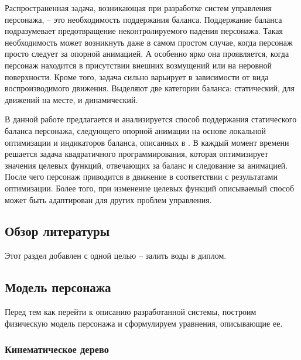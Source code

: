 Распространенная задача, возникающая при разработке систем управления персонажа, -- это необходимость поддержания баланса. Поддержание баланса подразумевает предотвращение неконтролируемого падения персонажа. Такая необходимость может возникнуть даже в самом простом случае, когда персонаж просто следует за опорной анимацией. А особенно ярко она проявляется, когда персонаж находится в присутствии внешних возмущений или на неровной поверхности. Кроме того, задача сильно варьирует в зависимости от вида воспроизводимого движения. Выделяют две категории баланса: статический, для движений на месте, и динамический.

В данной работе предлагается и анализируется способ поддержания статического баланса персонажа, следующего опорной анимации на основе локальной оптимизации и индикаторов баланса, описанных в \cite{MacchiettoZS}. В каждый момент времени решается задача квадратичного программирования, которая оптимизирует значения целевых функций, отвечающих за баланс и следование за анимацией. После чего персонаж приводится в движение в соответствии с результатами оптимизации. Более того, при изменение целевых функций описываемый способ может быть адаптирован для других проблем управления.

\subsection{Обзор литературы}

Этот раздел добавлен с одной целью -- залить воды в диплом.




\subsection{Модель персонажа}

Перед тем как перейти к описанию разработанной системы, построим физическую модель персонажа и сформулируем уравнения, описывающие ее.

\subsubsection{Кинематическое дерево}

